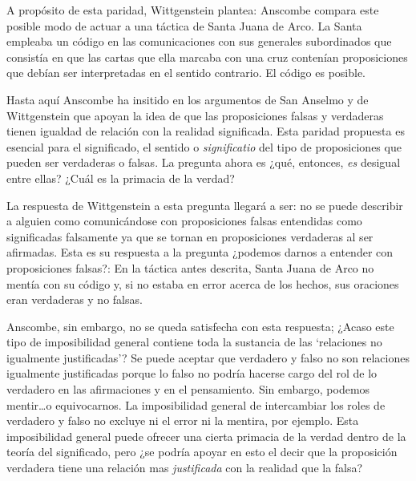 A propósito de esta paridad, Wittgenstein plantea: 
Anscombe compara este posible modo de actuar a una táctica de Santa Juana de
Arco. La Santa empleaba un código en las comunicaciones con sus generales
subordinados que consistía en que las cartas que ella marcaba con una cruz
contenían proposiciones que debían ser interpretadas en el sentido contrario. El
código es posible.

Hasta aquí Anscombe ha insitido en los argumentos de San Anselmo y de
Wittgenstein que apoyan la idea de que las proposiciones falsas y verdaderas
tienen igualdad de relación con la realidad significada. Esta paridad propuesta
es esencial para el significado, el sentido o \emph{significatio} del tipo de
proposiciones que pueden ser verdaderas o falsas. La pregunta ahora es ¿qué,
entonces, \emph{es} desigual entre ellas? ¿Cuál es la primacia de la verdad?

La respuesta de Wittgenstein a esta pregunta llegará a ser: no se puede
describir a alguien como comunicándose con proposiciones falsas entendidas como
significadas falsamente ya que se tornan en proposiciones verdaderas al ser
afirmadas. Esta es su respuesta a la pregunta ¿podemos darnos a entender con
proposiciones falsas?:  En la
táctica antes descrita, Santa Juana de Arco no mentía con su código y, si no
estaba en error acerca de los hechos, sus oraciones eran verdaderas y no falsas.

Anscombe, sin embargo, no se queda satisfecha con esta respuesta; ¿Acaso este
tipo de imposibilidad general contiene toda la sustancia de las `relaciones no
igualmente justificadas'? Se puede aceptar que verdadero y falso no son
relaciones igualmente justificadas porque lo falso no podría hacerse cargo del
rol de lo verdadero en las afirmaciones y en el pensamiento. Sin embargo,
podemos mentir\ldots o equivocarnos. La imposibilidad general de intercambiar
los roles de verdadero y falso no excluye ni el error ni la mentira, por
ejemplo. Esta imposibilidad general puede ofrecer una cierta primacia de la
verdad dentro de la teoría del significado, pero ¿se podría apoyar en esto el
decir que la proposición verdadera tiene una relación mas \emph{justificada} con
la realidad que la falsa?

